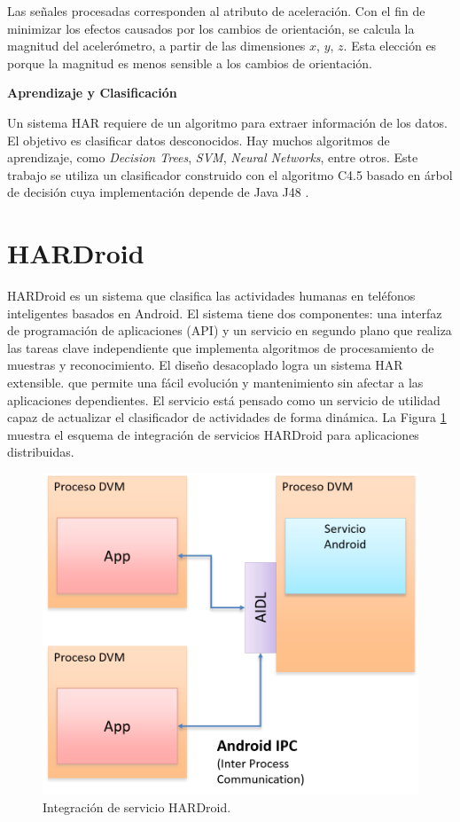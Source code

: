 \documentclass{sciposter}
\begin{document}
\begin{multicols}{3}
Las señales procesadas corresponden al atributo de aceleración. Con el fin de minimizar los efectos causados por los cambios de orientación, se calcula la magnitud del acelerómetro, a partir de las dimensiones $x$, $y$, $z$. Esta elección es porque la magnitud es menos sensible a los cambios de orientación. 

\textbf{Aprendizaje y Clasificación}

Un sistema HAR requiere de un algoritmo para extraer información de los datos. El objetivo es clasificar datos desconocidos. Hay muchos algoritmos de aprendizaje, como \textit{Decision Trees}, \textit{SVM}, \textit{Neural Networks}, entre otros. Este trabajo se utiliza un clasificador construido con el algoritmo C4.5 basado en árbol de decisión cuya implementación depende de Java J48 \cite{Frank2016b}.


\section{HARDroid}
HARDroid es un sistema que clasifica las actividades humanas en teléfonos inteligentes basados en Android. El sistema tiene dos componentes: una interfaz de programación de aplicaciones (API) y un servicio en segundo plano que realiza las tareas clave independiente que implementa algoritmos de procesamiento de muestras y reconocimiento. El diseño desacoplado logra un sistema HAR extensible. que permite una fácil evolución y mantenimiento sin afectar a las aplicaciones dependientes. El servicio está pensado como un servicio de utilidad capaz de actualizar el clasificador de actividades de forma dinámica. La Figura \ref{fig:hardroid} muestra el esquema de integración de servicios HARDroid para aplicaciones distribuidas.

\begin{figure}
	\centering
	\includegraphics[width=0.7\linewidth]{../capitulo-5/graphics/hardroid_func}
	\caption{Integración de servicio HARDroid.}
	\label{fig:hardroid}
\end{figure}


\end{multicols}
\end{document}
